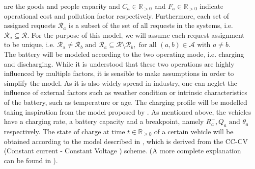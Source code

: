 are the goods and people capacity and $C_a \in \mathbb{R}_{>0}$ and $F_a \in \mathbb{R}_{>0}$ indicate operational cost and pollution factor respectively. Furthermore, each set of assigned requests $\mathcal{R}_a$ is a subset of the set of all requests in the systems, i.e. $\mathcal{R}_a \subseteq\mathcal{R}$. For the purpose of this model, we will assume each request assignment to be unique, i.e. $\mathcal{R}_a \neq \mathcal{R}_b \text{ and } \mathcal{R}_a \subseteq \mathcal{R} \setminus \mathcal{R}_b,  \text{ for all } (a,b) \in \mathcal{A} \text{ with } a\neq b$. \\
The battery will be modeled according to the two operating mode, i.e. charging and discharging. While it is understood that these two operations are highly influenced by multiple factors, it is sensible to make assumptions in order to simplify the model. 
As it is also widely spread in industry, one can neglet the influence of external factors such as weather condition or intrinsic characteristics of the battery, such as temperature or age. The charging profile will be modelled taking inspiration from the model proposed by . As mentioned above, the vehicles have a charging rate, a battery capacity and a breakpoint, namely $R^+_a, Q_a \text{ and } \theta_a$ respectively. The state of charge at time $t \in \mathbb{R}_{\ge0}$ of a certain vehicle will be obtained according to the model described in , which is derived from the CC-CV (Constant current - Constant Voltage ) scheme. (A more complete explanation can be found in \cite{LIU2020101342}).%

